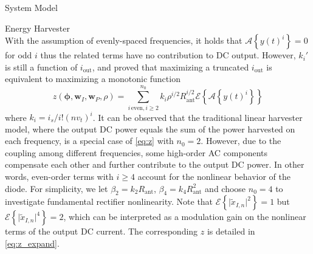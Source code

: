 \documentclass[journal]{IEEEtran}
\begin{document}
\begin{section}{System Model}
\begin{subsection}{Energy Harvester}
\begin{equation}
			\end{equation}
			With the assumption of evenly-spaced frequencies, it holds that $\mathcal{A}\left\{y(t)^i\right\}=0$ for odd $i$ thus the related terms have no contribution to DC output. However, $k_i'$ is still a function of $i_{\text{out}}$, and \cite{Clerckx2016a} proved that maximizing a truncated $i_{\text{out}}$ is equivalent to maximizing a monotonic function
			\begin{equation}\label{eq:z}
				z(\boldsymbol{\phi},\boldsymbol{w}_I,\boldsymbol{w}_P,\rho)=\sum_{i\,\text{even},i\ge2}^{n_0}{k_i}{\rho^{i/2}}{R_{\text{ant}}^{i/2}}{\mathcal{E}\left\{\mathcal{A}\left\{y(t)^i\right\}\right\}}
			\end{equation}
			where $k_i=i_s/i!(nv_t)^i$. It can be observed that the traditional linear harvester model, where the output DC power equals the sum of the power harvested on each frequency, is a special case of \ref{eq:z} with $n_0=2$. However, due to the coupling among different frequencies, some high-order AC components compensate each other and further contribute to the output DC power. In other words, even-order terms with $i \ge 4$ account for the nonlinear behavior of the diode. For simplicity, we let $\beta_2={k_2}{R_{\text{ant}}}$, $\beta_4={k_4}{R_{\text{ant}}^2}$ and choose $n_0=4$ to investigate fundamental rectifier nonlinearity. Note that $\mathcal{E}\left\{\lvert\tilde{x}_{I,n}\rvert^2\right\}=1$ but $\mathcal{E}\left\{\lvert\tilde{x}_{I,n}\rvert^4\right\}=2$, which can be interpreted as a modulation gain on the nonlinear terms of the output DC current. The corresponding $z$ is detailed in \ref{eq:z_expand}.


\end{subsection}
\end{section}
\end{document}
